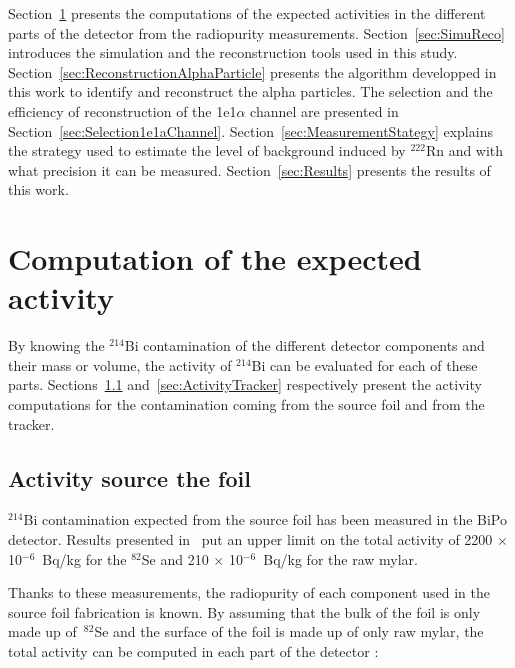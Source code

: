 \documentclass[main.tex]{subfiles}
\begin{document}
\bigskip


\NI Section~\ref{sec:ActivityComputation} presents the computations of the expected activities in the different parts of the detector from the radiopurity measurements.  Section~\ref{sec:SimuReco} introduces the simulation and the reconstruction tools used in this study. Section~\ref{sec:ReconstructionAlphaParticle} presents the algorithm developped in this work to identify and reconstruct the alpha particles. The selection and the efficiency of reconstruction of the 1e1$\alpha$ channel are presented in Section~\ref{sec:Selection1e1aChannel}. Section~\ref{sec:MeasurementStategy} explains the strategy used to estimate the level of background induced by $^{\text{222}}$Rn and with what precision it can be measured. Section~\ref{sec:Results} presents the results of this work.


\FloatBarrier




\section{Computation of the expected activity}\label{sec:ActivityComputation}


\NI By knowing the $^{\text{214}}$Bi contamination of the different detector components and their mass or volume, the activity of $^{\text{214}}$Bi can be evaluated for each of these parts. Sections~\ref{sec:ActivitySourceFoil} and~\ref{sec:ActivityTracker} respectively present the activity computations for the contamination coming from the source foil and from the tracker.  


\subsection{Activity source the foil}\label{sec:ActivitySourceFoil}


\noindent $^{\text{214}}$Bi contamination expected from the source foil has been measured in the BiPo detector. Results presented in~\cite{BiPoResultsGomez,BiPoResultsLoaiza} put an upper limit on the total activity of 2200 $\times$ 10$^{-\text{6}}$~Bq/kg for the $^{\text{82}}$Se and 210 $\times$ 10$^{-\text{6}}$~Bq/kg for the raw mylar.  


\bigskip


\noindent Thanks to these measurements, the radiopurity of each component used in the source foil fabrication is known. By assuming that the bulk of the foil is only made up of~$^{\text{82}}$Se and the surface of the foil is made up of only raw mylar, the total activity can be computed in each part of the detector : 
\end{document}
